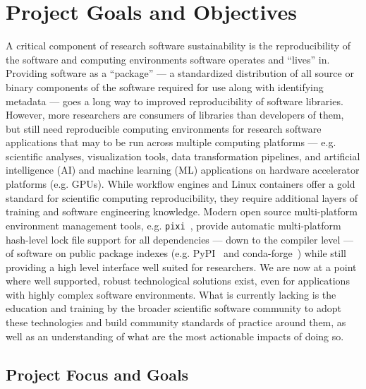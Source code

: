 \documentclass[letterpaper, 11pt]{article}
\newcommand{\pixi}{\texttt{pixi}}
\begin{document}
\pagestyle{fancy}

\section{Project Goals and Objectives}



A critical component of research software sustainability is the reproducibility of the software and computing environments software operates and ``lives'' in.
Providing software as a ``package'' --- a standardized distribution of all source or binary components of the software required for use along with identifying metadata --- goes a long way to improved reproducibility of software libraries.
However, more researchers are consumers of libraries than developers of them, but still need reproducible computing environments for research software applications that may to be run across multiple computing platforms --- e.g. scientific analyses, visualization tools, data transformation pipelines, and artificial intelligence (AI) and machine learning (ML) applications on hardware accelerator platforms (e.g. GPUs).
While workflow engines and Linux containers offer a gold standard for scientific computing reproducibility, they require additional layers of training and software engineering knowledge.
Modern open source multi-platform environment management tools, e.g. \pixi{}~\cite{Arts_pixi}, provide automatic multi-platform hash-level lock file support for all dependencies --- down to the compiler level --- of software on public package indexes (e.g. PyPI~\cite{PyPI_website} and conda-forge~\cite{conda-forge_community}) while still providing a high level interface well suited for researchers.
We are now at a point where well supported, robust technological solutions exist, even for applications with highly complex software environments.
What is currently lacking is the education and training by the broader scientific software community to adopt these technologies and build community standards of practice around them, as well as an understanding of what are the most actionable impacts of doing so.

\subsection{Project Focus and Goals}
\end{document}
